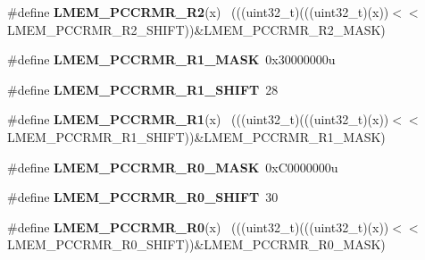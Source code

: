 \begin{DoxyCompactItemize}
\item 
\hypertarget{group___l_m_e_m___register___masks_ga0e003bbd9fa732fa526fbcd8c12f04cf}{}\#define {\bfseries L\+M\+E\+M\+\_\+\+P\+C\+C\+R\+M\+R\+\_\+\+R2}(x)                                            ~(((uint32\+\_\+t)(((uint32\+\_\+t)(x))$<$$<$L\+M\+E\+M\+\_\+\+P\+C\+C\+R\+M\+R\+\_\+\+R2\+\_\+\+S\+H\+I\+F\+T))\&L\+M\+E\+M\+\_\+\+P\+C\+C\+R\+M\+R\+\_\+\+R2\+\_\+\+M\+A\+S\+K)\label{group___l_m_e_m___register___masks_ga0e003bbd9fa732fa526fbcd8c12f04cf}

\item 
\hypertarget{group___l_m_e_m___register___masks_ga7c0c2d80f95cd0c362f4518b31c6f4b4}{}\#define {\bfseries L\+M\+E\+M\+\_\+\+P\+C\+C\+R\+M\+R\+\_\+\+R1\+\_\+\+M\+A\+S\+K}~0x30000000u\label{group___l_m_e_m___register___masks_ga7c0c2d80f95cd0c362f4518b31c6f4b4}

\item 
\hypertarget{group___l_m_e_m___register___masks_ga90dbec412446588f29deb1b404773d2a}{}\#define {\bfseries L\+M\+E\+M\+\_\+\+P\+C\+C\+R\+M\+R\+\_\+\+R1\+\_\+\+S\+H\+I\+F\+T}~28\label{group___l_m_e_m___register___masks_ga90dbec412446588f29deb1b404773d2a}

\item 
\hypertarget{group___l_m_e_m___register___masks_gad148d522d365d82de95a74d15e795b35}{}\#define {\bfseries L\+M\+E\+M\+\_\+\+P\+C\+C\+R\+M\+R\+\_\+\+R1}(x)                                            ~(((uint32\+\_\+t)(((uint32\+\_\+t)(x))$<$$<$L\+M\+E\+M\+\_\+\+P\+C\+C\+R\+M\+R\+\_\+\+R1\+\_\+\+S\+H\+I\+F\+T))\&L\+M\+E\+M\+\_\+\+P\+C\+C\+R\+M\+R\+\_\+\+R1\+\_\+\+M\+A\+S\+K)\label{group___l_m_e_m___register___masks_gad148d522d365d82de95a74d15e795b35}

\item 
\hypertarget{group___l_m_e_m___register___masks_ga0da58ad9370a6c268bc9acc2ecec01c3}{}\#define {\bfseries L\+M\+E\+M\+\_\+\+P\+C\+C\+R\+M\+R\+\_\+\+R0\+\_\+\+M\+A\+S\+K}~0x\+C0000000u\label{group___l_m_e_m___register___masks_ga0da58ad9370a6c268bc9acc2ecec01c3}

\item 
\hypertarget{group___l_m_e_m___register___masks_gaae5a8ffb80fe0cacb152ea6096c2f081}{}\#define {\bfseries L\+M\+E\+M\+\_\+\+P\+C\+C\+R\+M\+R\+\_\+\+R0\+\_\+\+S\+H\+I\+F\+T}~30\label{group___l_m_e_m___register___masks_gaae5a8ffb80fe0cacb152ea6096c2f081}

\item 
\hypertarget{group___l_m_e_m___register___masks_ga55ed78511011c771dc6c9947164a43e5}{}\#define {\bfseries L\+M\+E\+M\+\_\+\+P\+C\+C\+R\+M\+R\+\_\+\+R0}(x)                                            ~(((uint32\+\_\+t)(((uint32\+\_\+t)(x))$<$$<$L\+M\+E\+M\+\_\+\+P\+C\+C\+R\+M\+R\+\_\+\+R0\+\_\+\+S\+H\+I\+F\+T))\&L\+M\+E\+M\+\_\+\+P\+C\+C\+R\+M\+R\+\_\+\+R0\+\_\+\+M\+A\+S\+K)\label{group___l_m_e_m___register___masks_ga55ed78511011c771dc6c9947164a43e5}


\end{DoxyCompactItemize}
